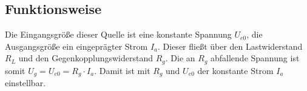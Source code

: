 \documentclass[a4paper]{hitec}
\begin{document}
\subsection{Funktionsweise}
Die Eingangsgröße dieser Quelle ist eine konstante Spannung $U_{e0}$, die Ausgangsgröße ein eingeprägter Strom $I_a$.
Dieser fließt über den Lastwiderstand $R_L$ und den Gegenkopplungswiderstand $R_g$.
Die an $R_g$ abfallende Spannung ist somit $U_g = U_{e0} = R_g \cdot I_a$.
Damit ist mit $R_g$ und $U_{e0}$ der konstante Strom $I_a$ einstellbar.





            

\end{document}
